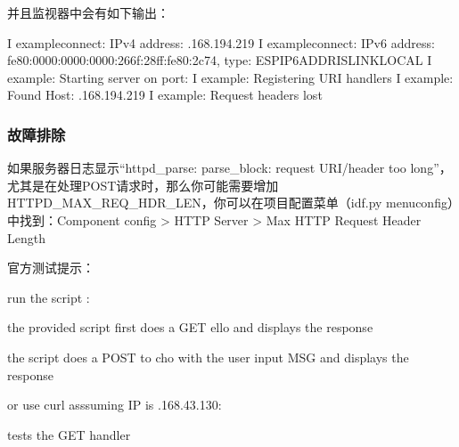 \documentclass[a4paper,12pt,english]{sphinxmanual}
\begin{document}
{{\sphinxAtStartPar
并且监视器中会有如下输出：

\begin{sphinxVerbatim}[commandchars=\\\{\}]
I  example\PYGZus{}connect: \PYGZhy{} IPv4 address: .168.194.219
I  example\PYGZus{}connect: \PYGZhy{} IPv6 address: fe80:0000:0000:0000:266f:28ff:fe80:2c74, type: ESP\PYGZus{}IP6\PYGZus{}ADDR\PYGZus{}IS\PYGZus{}LINK\PYGZus{}LOCAL
I  example: Starting server on port: 
I  example: Registering URI handlers
I  example: Found  \PYGZgt{} Host: .168.194.219
I  example: Request headers lost
\end{sphinxVerbatim}


\subsubsection{故障排除}
\label{\detokenize{exp-esp32/http:id6}}
\sphinxAtStartPar
如果服务器日志显示“httpd\_parse: parse\_block: request URI/header too long”，尤其是在处理POST请求时，那么你可能需要增加HTTPD\_MAX\_REQ\_HDR\_LEN，你可以在项目配置菜单（idf.py menuconfig）中找到：Component config \sphinxhyphen{}> HTTP Server \sphinxhyphen{}> Max HTTP Request Header Length

\sphinxAtStartPar
官方测试提示：

\begin{sphinxVerbatim}[commandchars=\\\{\}]
run the  script : 

the provided  script first does a GET ello and displays the response

the script does a POST to cho with the user input MSG and displays the response

or use curl asssuming IP is .168.43.130:

  \PYGZhy{} tests the GET  handler


\end{sphinxVerbatim}}}
\end{document}
